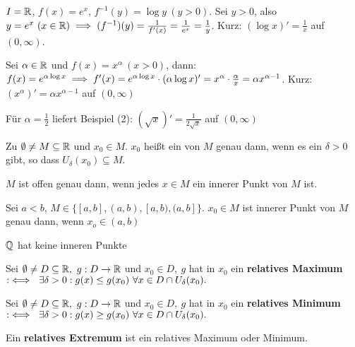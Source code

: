 \documentclass[a4paper,oneside,DIV15,BCOR12mm]{scrbook}
\begin{document}
\begin{beispiele}
\item $I=\mathbb{R}$, $f(x) = e^x$, $f^{-1}(y) = \log y\ (y>0)$. Sei $y>0$, also $y=e^x\ (x\in\mathbb{R}) \implies (f^{-1})(y) = \frac{1}{f'(x)} = \frac{1}{e^x} = \frac{1}{y}$. Kurz: $(\log x)' = \frac{1}{x}$ auf $(0,\infty)$.
\item Sei $\alpha \in\mathbb{R}$ und $f(x) = x^\alpha \ (x>0)$, dann: $f(x) = e^{\alpha \log x} \implies f'(x) = e^{\alpha \log x}\cdot (\alpha \log x)' = x^\alpha\cdot\frac{\alpha}{x} = \alpha x^{\alpha-1}$. Kurz: $(x^\alpha)' = \alpha x^{\alpha-1}$ auf $(0,\infty)$
\item Für $\alpha = \frac{1}{2}$ liefert Beispiel (2): $(\sqrt{x})' = \frac{1}{2\sqrt{x}}$ auf $(0,\infty)$
\end{beispiele}

\begin{definition}
Zu $\emptyset \ne M \subseteq \mathbb{R}$ und $x_0\in M$. $x_0$ heißt ein  von $M$ genau dann, wenn es ein $\delta>0$ gibt, so dass $U_\delta(x_0) \subseteq M$.
\end{definition}

\begin{beispiele}
\item $M$ ist offen genau dann, wenn jedes $x\in M$ ein innerer Punkt von $M$ ist.
\item Sei $a<b$, $M\in\{ [a,b], (a,b), [a,b), (a,b] \}$. $x_0 \in M$ ist innerer Punkt von $M$ genau dann, wenn $x_o\in(a,b)$
\item $\mathbb{Q}$ hat keine inneren Punkte
\end{beispiele}

\begin{definition}
Sei $\emptyset \ne D \subseteq \mathbb{R},\ g: D \to \mathbb{R}$ und $x_0 \in D,\ g$ hat in $x_0$ ein \textbf{relatives Maximum} $:\equizu\ \exists \delta>0: g(x)\leq g(x_0)\ \forall x \in D \cap U_\delta(x_0).$

Sei $\emptyset \ne D \subseteq \mathbb{R},\ g: D \to \mathbb{R}$ und $x_0 \in D,\ g$ hat in $x_0$ ein \textbf{relatives Minimum} $:\equizu\ \exists \delta>0: g(x)\geq g(x_0)\ \forall x \in D \cap U_\delta(x_0).$

Ein \textbf{relatives Extremum} ist ein relatives Maximum oder Minimum.
\end{definition}
\end{document}
